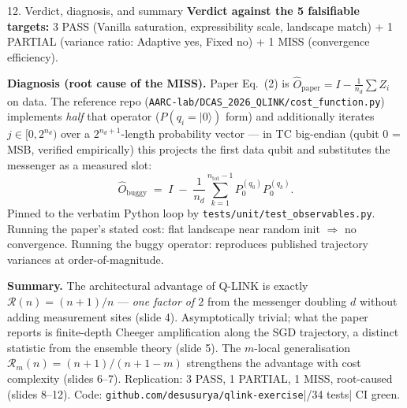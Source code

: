 \documentclass[10pt, aspectratio=169]{beamer}
\begin{document}
\begin{frame}{12. Verdict, diagnosis, and summary}
    \scriptsize
    \textbf{Verdict against the 5 falsifiable targets:} 3 \textcolor{pass}{PASS} (Vanilla saturation, expressibility scale, landscape match) + 1 \textcolor{flag}{PARTIAL} (variance ratio: Adaptive yes, Fixed no) + 1 \textcolor{miss}{MISS} (convergence efficiency).

    \textbf{Diagnosis (root cause of the MISS).} Paper Eq.\ (2) is $\hat O_{\mathrm{paper}} = I - \tfrac{1}{n_d}\sum Z_i$ on data. The reference repo (\texttt{AARC-lab/DCAS\_2026\_QLINK/cost\_function.py}) implements
    \emph{half} that operator ($P(q_i\!=\!|0\rangle)$ form) and additionally iterates
    $j \in [0, 2^{n_d})$ over a $2^{n_d+1}$-length probability vector — in TC big-endian (qubit 0 = MSB, verified empirically) this projects the first data qubit and substitutes the messenger as a measured slot:
    \[
        \hat O_{\mathrm{buggy}} \;=\; I \;-\; \frac{1}{n_d}\sum_{k=1}^{n_{\mathrm{tot}}-1} P_0^{(q_0)} P_0^{(q_k)}.
    \]
    Pinned to the verbatim Python loop by \texttt{tests/unit/test\_observables.py}.
    Running the paper's stated cost: flat landscape near random init $\Rightarrow$ no convergence.
    Running the buggy operator: reproduces published trajectory variances at order-of-magnitude.

    \vspace{0.3em}
    \textbf{Summary.} The architectural advantage of Q-LINK is exactly $\mathcal{R}(n) = (n+1)/n$ — \emph{one factor of $2$} from the messenger doubling $d$ without adding measurement sites (slide 4). Asymptotically trivial; what the paper reports is finite-depth Cheeger amplification along the SGD trajectory, a distinct statistic from the ensemble theory (slide 5). The $m$-local generalisation $\mathcal{R}_m(n) = (n+1)/(n+1-m)$ strengthens the advantage with cost complexity (slides 6–7). Replication: 3 PASS, 1 PARTIAL, 1 MISS, root-caused (slides 8–12). Code: \texttt{github.com/desusurya/qlink-exercise}\;|/34 tests\;|\; CI \textcolor{pass}{green}.
\end{frame}
\end{document}
